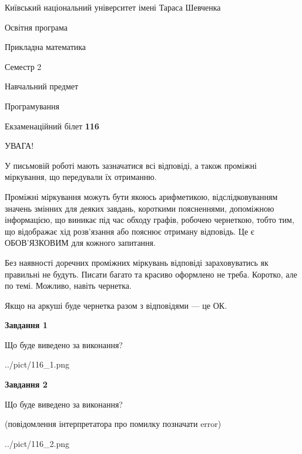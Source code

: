 \documentclass[12pt, ukrainian]{article}
\begin{document}
{{\begin {small}\par
{ \center  Київський національний університет імені Тараса Шевченка \par}
{\parbox {5 cm}{Освітня програма \hfill}{\parbox {7 cm}{Прикладна математика\hfill}}\parbox {6 cm}{\hfill Семестр 2}}\par
{\parbox {5 cm} {Навчальний предмет \hfill}\parbox {7 cm}{Програмування \hfill}\parbox {6cm}{\hfill}\par}\vspace{-7pt} \end{small}}{\center Екзаменаційний білет \No \textbf
{ 116 }\par}}
{
\begin {large}
УВАГА!

У письмовій роботі мають зазначатися всі відповіді, а також проміжні міркування, що передували їх отриманню.

Проміжні міркування можуть бути якоюсь арифметикою, відслідковуванням зна\-чень змінних для деяких завдань,
короткими поясненнями, допоміжною інформацією, що виникає під час обходу графів, робочею чернеткою,
тобто тим, що відображає хід розв’язання або пояснює отриману відповідь.
Це є ОБОВ’ЯЗКОВИМ для кожного запитання.

Без наявності доречних проміжних міркувань відповіді зараховуватись як правиль\-ні не будуть.
Писати багато та красиво оформлено не треба. Коротко, але по темі. Можли\-во, навіть чернетка.

Якщо на аркуші буде чернетка разом з відповідями --- це ОК.

\newpage

{\begin {center}\textbf{Завдання 1}\end {center}}\par
Що буде виведено за виконання?\par
\begin{center}
	{../pict/116_1.png}
\end{center}
\newpage

{\begin {center}\textbf{Завдання 2}\end {center}}\par
Що буде виведено за виконання?\par
 (повідомлення інтерпретатора про помилку позначати error)\par
\begin{center}
	{../pict/116_2.png}
\end{center}
\newpage


\end{large}}
\end{document}
